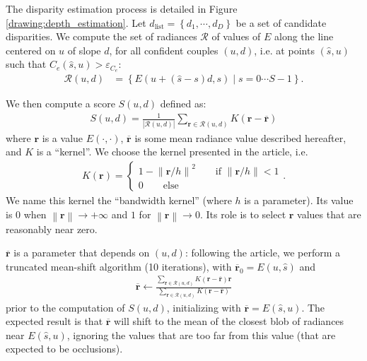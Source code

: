 \documentclass{article}
\newcommand{\abs} [1] {\left| #1 \right|}
\newcommand{\norm}[1]{\left\lVert#1\right\rVert}
\theoremstyle{definition}
\begin{document}
The disparity estimation process is detailed in Figure \ref{drawing:depth_estimation}. Let $d_\text{list} = \left\{d_1, \cdots, d_D \right\}$ be a set of candidate disparities. We compute the set of radiances $\mathcal{R}$ of values of $E$ along the line centered on $u$ of slope $d$, for all confident couples $(u, d)$, i.e. at points $(\widehat{s}, u)$ such that $C_e(\widehat{s}, u) > \varepsilon_{C_e}$:
\begin{align} 
\mathcal{R}(u, d) &= \left\{ E(u + (\widehat{s} - s) d, s) \; | \; s = 0 \cdots S-1 \right\}.
\end{align}

We then compute a score $S(u, d)$ defined as:
\begin{align} 
S(u, d) = \frac{1}{\abs{\mathcal{R}(u, d)}} \sum_{\mathbf{r} \in \mathcal{R}(u, d)} K(\mathbf{r} - \overline{\mathbf{r}})
\end{align}
where $\mathbf{r}$ is a value $E(\cdot, \cdot)$, $\overline{\mathbf{r}}$ is some mean radiance value described hereafter, and $K$ is a ``kernel''. We choose the kernel presented in the article, i.e.
\begin{align}
K(\mathbf{r}) = \left\{ 
\begin{array}{l}
1 - \norm{\mathbf{r} / h}^2 \qquad \text{if $\norm{\mathbf{r} / h} < 1$} \\
0 \qquad \text{else}                            
\end{array} \right. .
\end{align}
We name this kernel the ``bandwidth kernel'' (where $h$ is a parameter). Its value is $0$ when $\norm{\mathbf{r}} \rightarrow +\infty$ and $1$ for $\norm{\mathbf{r}} \rightarrow 0$. Its role is to select $\mathbf{r}$ values that are reasonably near zero.

$\overline{\mathbf{r}}$ is a parameter that depends on $(u, d)$: following the article, we perform a truncated mean-shift algorithm (10 iterations), with $\overline{\mathbf{r}}_0 = E(u, \widehat{s})$ and
\begin{align} 
\overline{\mathbf{r}} \leftarrow \frac{\sum_{\mathbf{r} \in \mathcal{R}(u, d)} K(\mathbf{r} - \overline{\mathbf{r}}) \mathbf{r}}{\sum_{\mathbf{r} \in \mathcal{R}(u, d)} K(\mathbf{r} - \overline{\mathbf{r}})}
\end{align}
prior to the computation of $S(u, d)$, initializing with $\overline{\mathbf{r}} = E(\widehat{s}, u)$. The expected result is that $\overline{\mathbf{r}}$ will shift to the mean of the closest blob of radiances near $E(\widehat{s}, u)$, ignoring the values that are too far from this value (that are expected to be occlusions).
\end{document}
